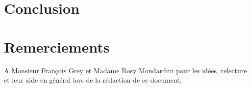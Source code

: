 \documentclass[10pt, article]{llncs}
\begin{document}
\section{Conclusion}\label{sec:conclusion}

\section*{Remerciements}
	A Monsieur François Grey et Madame Rosy Mondardini pour les idées, relecture et leur aide en général lors de la rédaction de ce document.


\fancyhf{}


\end{document}
